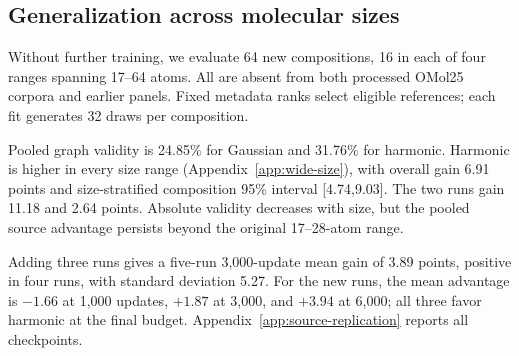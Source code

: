 \subsection{Generalization across molecular sizes}\label{sec:wide}
Without further training, we evaluate 64 new compositions, 16 in each of four ranges spanning 17--64 atoms. All are absent from both processed OMol25 corpora and earlier panels. Fixed metadata ranks select eligible references; each fit generates 32 draws per composition.

Pooled graph validity is 24.85\% for Gaussian and 31.76\% for harmonic. Harmonic is higher in every size range (Appendix~\ref{app:wide-size}), with overall gain 6.91 points and size-stratified composition 95\% interval [4.74,9.03]. The two runs gain 11.18 and 2.64 points. Absolute validity decreases with size, but the pooled source advantage persists beyond the original 17--28-atom range.

Adding three runs gives a five-run 3,000-update mean gain of 3.89 points, positive in four runs, with standard deviation 5.27. For the new runs, the mean advantage is $-1.66$ at 1,000 updates, $+1.87$ at 3,000, and $+3.94$ at 6,000; all three favor harmonic at the final budget. Appendix~\ref{app:source-replication} reports all checkpoints.
